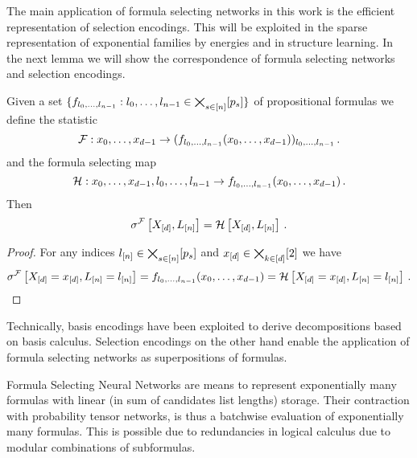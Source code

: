 
The main application of formula selecting networks in this work is the efficient representation of selection encodings.
This will be exploited in the sparse representation of exponential families by energies and in structure learning.
In the next lemma we will show the correspondence of formula selecting networks and selection encodings.

\begin{lemma}\label{lem:relToSelFSN}
	Given a set $\{f_{l_{0},\ldots,l_{n-1}} : l_{0},\ldots,l_{n-1}\in\bigtimes_{s\in[n]}[p_{s}]\}$ of propositional formulas we define the statistic
		 \[ \mathcal{F} : x_{0},\ldots,x_{d-1} \rightarrow (f_{l_{0},\ldots,l_{n-1}}(x_{0},\ldots,x_{d-1}))_{l_{0},\ldots,l_{n-1}} \, . \]
	and the formula selecting map
		\[ \mathcal{H}: x_{0},\ldots,x_{d-1} , l_{0},\ldots,l_{n-1} \rightarrow f_{l_{0},\ldots,l_{n-1}} (x_{0},\ldots,x_{d-1}) \, . \]
	Then 
		\[ \sigma^{\mathcal{F}}\left[X_{[d]}, L_{[n]}\right] = \mathcal{H}\left[X_{[d]}, L_{[n]} \right] \, .  \]
\end{lemma}
\begin{proof}
	For any indices $l_{[n]}\in\bigtimes_{s\in[n]}[p_{s}]$ and $x_{[d]}\in\bigtimes_{k\in[d]}[2]$ we have
	\begin{align*}
		\sigma^{\mathcal{F}}\left[X_{[d]}=x_{[d]}, L_{[n]}=l_{[n]}\right]
		=  f_{l_{0},\ldots,l_{n-1}}(x_{0},\ldots,x_{d-1}) =  \mathcal{H}\left[X_{[d]}=x_{[d]}, L_{[n]}=l_{[n]} \right] \, . 
	\end{align*}
\end{proof}

Technically, basis encodings have been exploited to derive decompositions based on basis calculus.
Selection encodings on the other hand enable the application of formula selecting networks as superpositions of formulas.




Formula Selecting Neural Networks are means to represent exponentially many formulas with linear (in sum of candidates list lengths) storage.
Their contraction with probability tensor networks, is thus a batchwise evaluation of exponentially many formulas.
This is possible due to redundancies in logical calculus due to modular combinations of subformulas.

